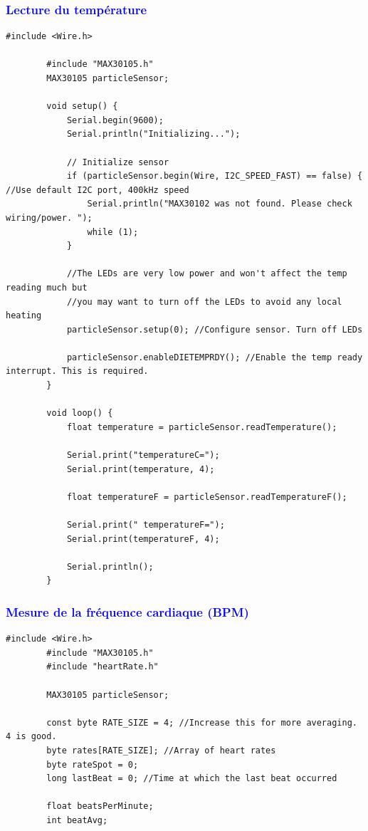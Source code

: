 \begin{flushleft}
	\subsubsection{\textcolor{blue}{Lecture du température}}
	\begin{lstlisting}[style=CStyle]
		#include <Wire.h>
		
		#include "MAX30105.h"
		MAX30105 particleSensor;
		
		void setup() {
			Serial.begin(9600);
			Serial.println("Initializing...");
			
			// Initialize sensor
			if (particleSensor.begin(Wire, I2C_SPEED_FAST) == false) { //Use default I2C port, 400kHz speed
				Serial.println("MAX30102 was not found. Please check wiring/power. ");
				while (1);
			}
			
			//The LEDs are very low power and won't affect the temp reading much but
			//you may want to turn off the LEDs to avoid any local heating
			particleSensor.setup(0); //Configure sensor. Turn off LEDs
			
			particleSensor.enableDIETEMPRDY(); //Enable the temp ready interrupt. This is required.
		}
		
		void loop() {
			float temperature = particleSensor.readTemperature();
			
			Serial.print("temperatureC=");
			Serial.print(temperature, 4);
			
			float temperatureF = particleSensor.readTemperatureF();
			
			Serial.print(" temperatureF=");
			Serial.print(temperatureF, 4);
			
			Serial.println();
		}
	\end{lstlisting}
	
	
	
	\subsubsection{\textcolor{blue}{Mesure de la fréquence cardiaque (BPM)}}
	\begin{lstlisting}[style=CStyle]
		#include <Wire.h>
		#include "MAX30105.h"
		#include "heartRate.h"
		
		MAX30105 particleSensor;
		
		const byte RATE_SIZE = 4; //Increase this for more averaging. 4 is good.
		byte rates[RATE_SIZE]; //Array of heart rates
		byte rateSpot = 0;
		long lastBeat = 0; //Time at which the last beat occurred
		
		float beatsPerMinute;
		int beatAvg;
		

\end{lstlisting}
\end{flushleft}
